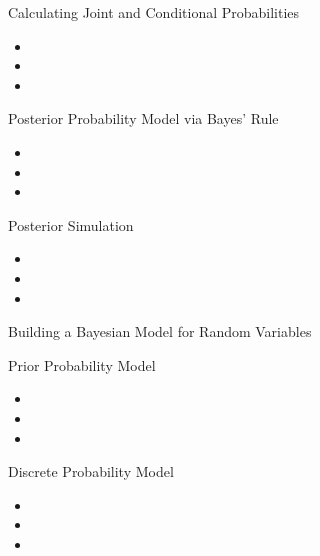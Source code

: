 \documentclass[12pt]{beamer}
\begin{document}
\begin{frame}{}
\begin{block}{Calculating Joint and Conditional Probabilities}
\begin{itemize}
\item 
\item 
\item 
\end{itemize}
\end{block}
\end{frame}

\begin{frame}{}
\begin{block}{Posterior Probability Model via Bayes’ Rule}
\begin{itemize}
\item 
\item 
\item 
\end{itemize}
\end{block}
\end{frame}

\begin{frame}{}
\begin{block}{Posterior Simulation}
\begin{itemize}
\item 
\item 
\item 
\end{itemize}
\end{block}
\end{frame}

\begin{frame}{Building a Bayesian Model for Random Variables}
\begin{block}{Prior Probability Model}
\begin{itemize}
\item 
\item 
\item 
\end{itemize}
\end{block}
\end{frame}

\begin{frame}{}
\begin{block}{Discrete Probability Model}
\begin{itemize}
\item 
\item 
\item 
\end{itemize}
\end{block}
\end{frame}
\end{document}
